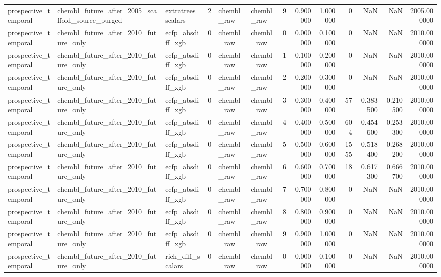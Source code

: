 \begin{longtable}{lllrllrrrrrrr}
prospective\_temporal & chembl\_future\_after\_2005\_scaffold\_source\_purged & extratrees\_scalars & 2 & chembl\_raw & chembl\_raw & 9 & 0.900000 & 1.000000 & 0 & NaN & NaN & 2005.000000 \\
prospective\_temporal & chembl\_future\_after\_2010\_future\_only & ecfp\_absdiff\_xgb & 0 & chembl\_raw & chembl\_raw & 0 & 0.000000 & 0.100000 & 0 & NaN & NaN & 2010.000000 \\
prospective\_temporal & chembl\_future\_after\_2010\_future\_only & ecfp\_absdiff\_xgb & 0 & chembl\_raw & chembl\_raw & 1 & 0.100000 & 0.200000 & 0 & NaN & NaN & 2010.000000 \\
prospective\_temporal & chembl\_future\_after\_2010\_future\_only & ecfp\_absdiff\_xgb & 0 & chembl\_raw & chembl\_raw & 2 & 0.200000 & 0.300000 & 0 & NaN & NaN & 2010.000000 \\
prospective\_temporal & chembl\_future\_after\_2010\_future\_only & ecfp\_absdiff\_xgb & 0 & chembl\_raw & chembl\_raw & 3 & 0.300000 & 0.400000 & 57 & 0.383500 & 0.210500 & 2010.000000 \\
prospective\_temporal & chembl\_future\_after\_2010\_future\_only & ecfp\_absdiff\_xgb & 0 & chembl\_raw & chembl\_raw & 4 & 0.400000 & 0.500000 & 604 & 0.454600 & 0.253300 & 2010.000000 \\
prospective\_temporal & chembl\_future\_after\_2010\_future\_only & ecfp\_absdiff\_xgb & 0 & chembl\_raw & chembl\_raw & 5 & 0.500000 & 0.600000 & 1555 & 0.518400 & 0.268200 & 2010.000000 \\
prospective\_temporal & chembl\_future\_after\_2010\_future\_only & ecfp\_absdiff\_xgb & 0 & chembl\_raw & chembl\_raw & 6 & 0.600000 & 0.700000 & 18 & 0.617300 & 0.666700 & 2010.000000 \\
prospective\_temporal & chembl\_future\_after\_2010\_future\_only & ecfp\_absdiff\_xgb & 0 & chembl\_raw & chembl\_raw & 7 & 0.700000 & 0.800000 & 0 & NaN & NaN & 2010.000000 \\
prospective\_temporal & chembl\_future\_after\_2010\_future\_only & ecfp\_absdiff\_xgb & 0 & chembl\_raw & chembl\_raw & 8 & 0.800000 & 0.900000 & 0 & NaN & NaN & 2010.000000 \\
prospective\_temporal & chembl\_future\_after\_2010\_future\_only & ecfp\_absdiff\_xgb & 0 & chembl\_raw & chembl\_raw & 9 & 0.900000 & 1.000000 & 0 & NaN & NaN & 2010.000000 \\
prospective\_temporal & chembl\_future\_after\_2010\_future\_only & rich\_diff\_scalars & 0 & chembl\_raw & chembl\_raw & 0 & 0.000000 & 0.100000 & 0 & NaN & NaN & 2010.000000 \\

\end{longtable}
